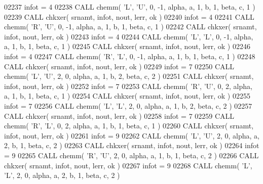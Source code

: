 \begin{DoxyCode}
02237       infot = 4
02238       \textcolor{keyword}{CALL }chemm( \textcolor{stringliteral}{'L'}, \textcolor{stringliteral}{'U'}, 0, -1, alpha, a, 1, b, 1, beta, c, 1 )
02239       \textcolor{keyword}{CALL }chkxer( srnamt, infot, nout, lerr, ok )
02240       infot = 4
02241       \textcolor{keyword}{CALL }chemm( \textcolor{stringliteral}{'R'}, \textcolor{stringliteral}{'U'}, 0, -1, alpha, a, 1, b, 1, beta, c, 1 )
02242       \textcolor{keyword}{CALL }chkxer( srnamt, infot, nout, lerr, ok )
02243       infot = 4
02244       \textcolor{keyword}{CALL }chemm( \textcolor{stringliteral}{'L'}, \textcolor{stringliteral}{'L'}, 0, -1, alpha, a, 1, b, 1, beta, c, 1 )
02245       \textcolor{keyword}{CALL }chkxer( srnamt, infot, nout, lerr, ok )
02246       infot = 4
02247       \textcolor{keyword}{CALL }chemm( \textcolor{stringliteral}{'R'}, \textcolor{stringliteral}{'L'}, 0, -1, alpha, a, 1, b, 1, beta, c, 1 )
02248       \textcolor{keyword}{CALL }chkxer( srnamt, infot, nout, lerr, ok )
02249       infot = 7
02250       \textcolor{keyword}{CALL }chemm( \textcolor{stringliteral}{'L'}, \textcolor{stringliteral}{'U'}, 2, 0, alpha, a, 1, b, 2, beta, c, 2 )
02251       \textcolor{keyword}{CALL }chkxer( srnamt, infot, nout, lerr, ok )
02252       infot = 7
02253       \textcolor{keyword}{CALL }chemm( \textcolor{stringliteral}{'R'}, \textcolor{stringliteral}{'U'}, 0, 2, alpha, a, 1, b, 1, beta, c, 1 )
02254       \textcolor{keyword}{CALL }chkxer( srnamt, infot, nout, lerr, ok )
02255       infot = 7
02256       \textcolor{keyword}{CALL }chemm( \textcolor{stringliteral}{'L'}, \textcolor{stringliteral}{'L'}, 2, 0, alpha, a, 1, b, 2, beta, c, 2 )
02257       \textcolor{keyword}{CALL }chkxer( srnamt, infot, nout, lerr, ok )
02258       infot = 7
02259       \textcolor{keyword}{CALL }chemm( \textcolor{stringliteral}{'R'}, \textcolor{stringliteral}{'L'}, 0, 2, alpha, a, 1, b, 1, beta, c, 1 )
02260       \textcolor{keyword}{CALL }chkxer( srnamt, infot, nout, lerr, ok )
02261       infot = 9
02262       \textcolor{keyword}{CALL }chemm( \textcolor{stringliteral}{'L'}, \textcolor{stringliteral}{'U'}, 2, 0, alpha, a, 2, b, 1, beta, c, 2 )
02263       \textcolor{keyword}{CALL }chkxer( srnamt, infot, nout, lerr, ok )
02264       infot = 9
02265       \textcolor{keyword}{CALL }chemm( \textcolor{stringliteral}{'R'}, \textcolor{stringliteral}{'U'}, 2, 0, alpha, a, 1, b, 1, beta, c, 2 )
02266       \textcolor{keyword}{CALL }chkxer( srnamt, infot, nout, lerr, ok )
02267       infot = 9
02268       \textcolor{keyword}{CALL }chemm( \textcolor{stringliteral}{'L'}, \textcolor{stringliteral}{'L'}, 2, 0, alpha, a, 2, b, 1, beta, c, 2 )

\end{DoxyCode}
